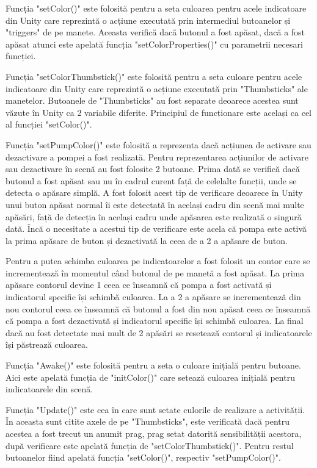 Funcția "setColor()" este folosită pentru a seta culoarea pentru acele indicatoare din Unity care reprezintă o acțiune executată prin intermediul butoanelor și "triggers" de pe manete. Aceasta verifică dacă butonul a fost apăsat, dacă a fost apăsat atunci este apelată funcția  "setColorProperties()" cu parametrii necesari funcției.

Funcția "setColorThumbstick()" este folosită pentru a seta culoare pentru acele  indicatoare din Unity care reprezintă o acțiune executată prin "Thumbsticks" ale manetelor. Butoanele de "Thumbsticks" au fost separate deoarece acestea sunt văzute în Unity ca 2 variabile diferite. Principiul de funcționare este același ca cel al funcției "setColor()".

Funcția "setPumpColor()" este folosită a reprezenta dacă acțiunea de activare sau dezactivare a pompei a fost realizată. Pentru reprezentarea acțiunilor de activare sau dezactivare în scenă au fost folosite 2 butoane. Prima dată se verifică dacă butonul a fost apăsat sau nu în cadrul curent față de celelalte funcții, unde se detecta o apăsare simplă. A fost folosit acest tip de verificare deoarece în Unity unui buton apăsat normal îi este detectată în același cadru din scenă mai multe apăsări, față de detecția în același cadru unde  apăsarea este realizată o singură dată. Încă o necesitate a acestui tip de verificare este acela că pompa este activă la prima apăsare de buton și dezactivată la ceea de a 2 a apăsare de buton. 

Pentru a putea schimba culoarea pe indicatoarelor a fost folosit un contor care se incrementează în momentul când butonul de pe manetă a fost apăsat. La prima apăsare contorul devine 1 ceea ce înseamnă că pompa a fost activată și indicatorul specific își schimbă culoarea. La a 2 a apăsare se incrementează din nou contorul ceea ce înseamnă că butonul a fost din nou apăsat ceea ce înseamnă că pompa a fost dezactivată  și indicatorul specific își schimbă culoarea. La final dacă au fost detectate mai mult de 2 apăsări se resetează contorul și indicatoarele își păstrează culoarea.

Funcția  "Awake()" este folosită pentru a seta o culoare inițială pentru butoane. Aici este apelată funcția de "initColor()" care setează culoarea inițială pentru indicatoarele din scenă.

Funcția "Update()" este cea în care sunt setate culorile de realizare a activității. În aceasta sunt citite axele de pe "Thumbsticks", este verificată dacă pentru acestea a fost trecut un anumit prag, prag setat datorită sensibilității acestora, după verificare este apelată funcția de "setColorThumbstick()". Pentru restul butoanelor fiind apelată funcția "setColor()", respectiv "setPumpColor()".

